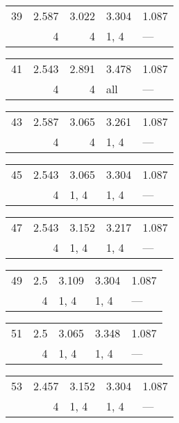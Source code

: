 \begin{tabular}{lrrll}
\toprule
 39 & 2.587 & 3.022 & 3.304 & 1.087 \\
    & 4     & 4     & 1, 4  & ---   \\
\bottomrule
\end{tabular}
\begin{tabular}{lrrll}
\toprule
 41 & 2.543 & 2.891 & 3.478 & 1.087 \\
    & 4     & 4     & all   & ---   \\
\bottomrule
\end{tabular}
\begin{tabular}{lrrll}
\toprule
 43 & 2.587 & 3.065 & 3.261 & 1.087 \\
    & 4     & 4     & 1, 4  & ---   \\
\bottomrule
\end{tabular}
\begin{tabular}{lrlll}
\toprule
 45 & 2.543 & 3.065 & 3.304 & 1.087 \\
    & 4     & 1, 4  & 1, 4  & ---   \\
\bottomrule
\end{tabular}
\begin{tabular}{lrlll}
\toprule
 47 & 2.543 & 3.152 & 3.217 & 1.087 \\
    & 4     & 1, 4  & 1, 4  & ---   \\
\bottomrule
\end{tabular}
\begin{tabular}{lrlll}
\toprule
 49 & 2.5 & 3.109 & 3.304 & 1.087 \\
    & 4   & 1, 4  & 1, 4  & ---   \\
\bottomrule
\end{tabular}
\begin{tabular}{lrlll}
\toprule
 51 & 2.5 & 3.065 & 3.348 & 1.087 \\
    & 4   & 1, 4  & 1, 4  & ---   \\
\bottomrule
\end{tabular}
\begin{tabular}{lrlll}
\toprule
 53 & 2.457 & 3.152 & 3.304 & 1.087 \\
    & 4     & 1, 4  & 1, 4  & ---   \\
\bottomrule
\end{tabular}
